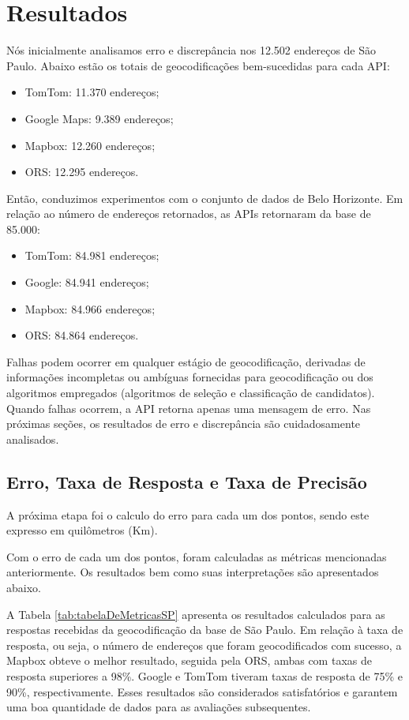 \chapter{Resultados} \label{resultado}

Nós inicialmente analisamos erro e discrepância nos 12.502 endereços de São Paulo. Abaixo estão os totais de geocodificações bem-sucedidas para cada API:

\begin{itemize}
    \item TomTom: 11.370 endereços;
    \item Google Maps: 9.389 endereços;
    \item Mapbox: 12.260 endereços;
    \item ORS: 12.295 endereços.
\end{itemize}

Então, conduzimos experimentos com o conjunto de dados de Belo Horizonte. Em relação ao número de endereços retornados, as APIs retornaram da base de 85.000:

\begin{itemize}
    \item TomTom: 84.981 endereços;
    \item Google: 84.941 endereços;
    \item Mapbox: 84.966 endereços; 
    \item ORS: 84.864 endereços.
\end{itemize}    

Falhas podem ocorrer em qualquer estágio de geocodificação, derivadas de informações incompletas ou ambíguas fornecidas para geocodificação ou dos algoritmos empregados (algoritmos de seleção e classificação de candidatos). Quando falhas ocorrem, a API retorna apenas uma mensagem de erro. Nas próximas seções, os resultados de erro e discrepância são cuidadosamente analisados.

\section{Erro, Taxa de Resposta e Taxa de Precisão}

A próxima etapa foi o calculo do erro para cada um dos pontos, sendo este expresso em quilômetros (Km).

Com o erro de cada um dos pontos, foram calculadas as métricas mencionadas anteriormente. Os resultados bem como suas interpretações são apresentados abaixo.

A Tabela \ref{tab:tabelaDeMetricasSP} apresenta os resultados calculados para as respostas recebidas da geocodificação da base de São Paulo. Em relação à taxa de resposta, ou seja, o número de endereços que foram geocodificados com sucesso, a Mapbox obteve o melhor resultado, seguida pela ORS, ambas com taxas de resposta superiores a 98\%. Google e TomTom tiveram taxas de resposta de 75\% e 90\%, respectivamente. Esses resultados são considerados satisfatórios e garantem uma boa quantidade de dados para as avaliações subsequentes.

